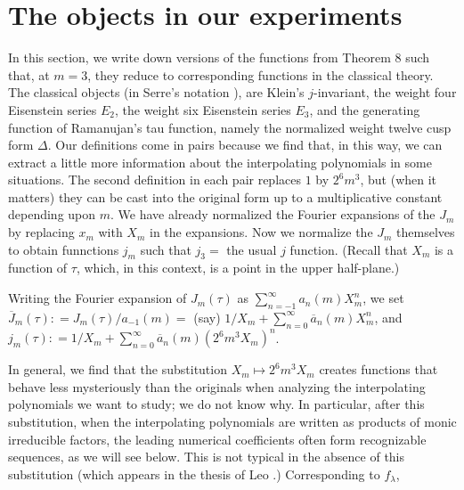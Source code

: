 \documentclass{article}
\begin{document}
\section{The objects in our experiments}
In this section, we
write down versions of 
the functions from Theorem 8
such that, 
at $m = 3$, they 
reduce  to corresponding
functions in the classical theory.
The classical objects
(in Serre's notation \cite{serre1970course}),
are Klein's $j$-invariant, the weight four
Eisenstein series $E_2$,
the weight six Eisenstein series $E_3$,
and the generating function of Ramanujan's
tau function, namely the normalized weight twelve
cusp form $\Delta$. Our definitions
come in pairs because we find that,
in this way, we can
extract a little more information
about the interpolating polynomials
in some situations.
The second definition in each pair
replaces $1$ by $2^6 m^3$, but
(when it matters) they can be cast into
the original form up to a multiplicative constant
depending upon $m$.
\newline \newline \noindent
We have already normalized the Fourier expansions of 
the $J_m$ by replacing $x_m$ with 
$X_m$ in the expansions. Now we normalize 
the $J_m$ themselves to obtain 
funnctions $j_m$ such that $j_3 = $
the usual  $j$ function.
(Recall that $X_m$ is a function of $\tau$, which,
in this context,
is a point in the upper half-plane.)
\begin{definition} 
Writing the Fourier expansion of $J_m(\tau)$ as
$\sum_{n = -1}^{\infty}a_n(m) X_m^n$,
we set
$\overline{J}_m(\tau): = J_m(\tau)/a_{-1}(m) = $ (say)
$1/X_m + \sum_{n = 0}^{\infty}\overline{a}_n(m) X_m^n$,
and 
$j_m(\tau): = 
1/X_m+\sum_{n = 0}^{\infty}
\overline{a}_n(m) (2^6 m^3 X_m)^n$.
\end{definition} \noindent
In general, we find that the substitution 
$X_m \mapsto 2^6 m^3 X_m$
creates functions that behave
less mysteriously than the originals
when analyzing the interpolating
polynomials we want to study;
we do not know why. In particular, 
after this substitution,
when the interpolating polynomials
are written
as products of
monic irreducible factors,
the leading numerical coefficients
often form recognizable sequences, as we
will see below. This is
not typical in the absence of 
this substitution
(which
appears in the thesis of Leo
\cite{leo2008fourier}.)
\newline \newline \noindent
Corresponding to $f_{\lambda}$,
\end{document}
